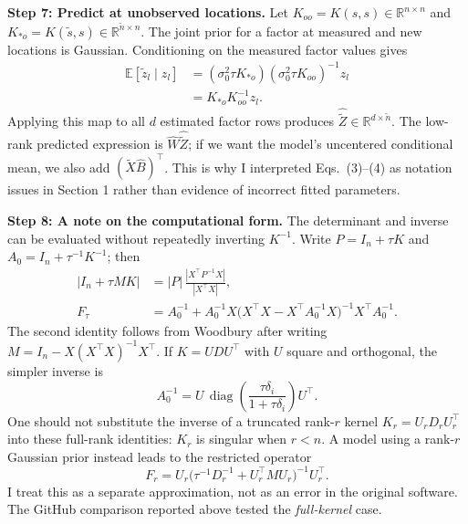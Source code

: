 \documentclass[11pt,letterpaper]{article}
\newcommand{\R}{\mathbb R}
\begin{document}
\textbf{Step 7: Predict at unobserved locations.}
Let $K_{oo}=K(s,s)\in\R^{n\times n}$ and $K_{*o}=K(\widetilde s,s)\in\R^{\widetilde n\times n}$. The joint prior for a factor at measured and new locations is Gaussian. Conditioning on the measured factor values gives
\begin{align}
\mathbb E[\widetilde z_l\mid z_l]
&=(\sigma_0^2\tau K_{*o})(\sigma_0^2\tau K_{oo})^{-1}z_l\\
&=\boxed{K_{*o}K_{oo}^{-1}z_l}.
\end{align}
Applying this map to all $d$ estimated factor rows produces $\widehat{\widetilde Z}\in\R^{d\times\widetilde n}$. The low-rank predicted expression is $\widehat W\widehat{\widetilde Z}$; if we want the model's uncentered conditional mean, we also add $(\widetilde X\widehat B)^\top$. This is why I interpreted Eqs.~(3)--(4) as notation issues in Section 1 rather than evidence of incorrect fitted parameters.

\textbf{Step 8: A note on the computational form.}
The determinant and inverse can be evaluated without repeatedly inverting $K^{-1}$. Write $P=I_n+\tau K$ and $A_0=I_n+\tau^{-1}K^{-1}$; then
\begin{align}
|I_n+\tau MK|
&=|P|\,\frac{|X^\top P^{-1}X|}{|X^\top X|},\label{eq:full-det}\\[2pt]
F_\tau
&=A_0^{-1}+A_0^{-1}X
\big(X^\top X-X^\top A_0^{-1}X\big)^{-1}
X^\top A_0^{-1}.\label{eq:full-woodbury}
\end{align}
The second identity follows from Woodbury after writing $M=I_n-X(X^\top X)^{-1}X^\top$. If $K=UDU^\top$ with $U$ square and orthogonal, the simpler inverse is
\begin{equation}
A_0^{-1}=U\,\operatorname{diag}\!\left(
\frac{\tau\delta_i}{1+\tau\delta_i}\right)U^\top.
\end{equation}
One should not substitute the inverse of a truncated rank-$r$ kernel $K_r=U_rD_rU_r^\top$ into these full-rank identities: $K_r$ is singular when $r<n$. A model using a rank-$r$ Gaussian prior instead leads to the restricted operator
\begin{equation}
F_r=U_r\big(\tau^{-1}D_r^{-1}+U_r^\top MU_r\big)^{-1}U_r^\top.
\end{equation}
I treat this as a separate approximation, not as an error in the original software. The GitHub comparison reported above tested the \emph{full-kernel} case.
\end{document}
